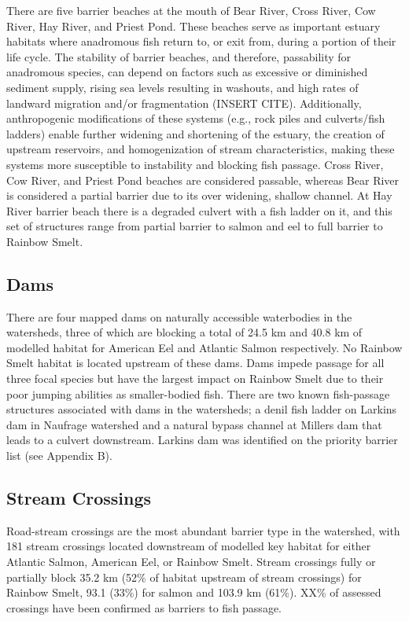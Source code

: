 \documentclass[
  letterpaper,
  DIV=11,
  numbers=noendperiod]{scrreprt}
\begin{document}
There are five barrier beaches at the mouth of Bear River, Cross River,
Cow River, Hay River, and Priest Pond. These beaches serve as important
estuary habitats where anadromous fish return to, or exit from, during a
portion of their life cycle. The stability of barrier beaches, and
therefore, passability for anadromous species, can depend on factors
such as excessive or diminished sediment supply, rising sea levels
resulting in washouts, and high rates of landward migration and/or
fragmentation (INSERT CITE). Additionally, anthropogenic modifications
of these systems (e.g., rock piles and culverts/fish ladders) enable
further widening and shortening of the estuary, the creation of upstream
reservoirs, and homogenization of stream characteristics, making these
systems more susceptible to instability and blocking fish passage. Cross
River, Cow River, and Priest Pond beaches are considered passable,
whereas Bear River is considered a partial barrier due to its over
widening, shallow channel. At Hay River barrier beach there is a
degraded culvert with a fish ladder on it, and this set of structures
range from partial barrier to salmon and eel to full barrier to Rainbow
Smelt.

\subsection*{Dams}\label{dams}

There are four mapped dams on naturally accessible waterbodies in the
watersheds, three of which are blocking a total of 24.5 km and 40.8 km
of modelled habitat for American Eel and Atlantic Salmon respectively.
No Rainbow Smelt habitat is located upstream of these dams. Dams impede
passage for all three focal species but have the largest impact on
Rainbow Smelt due to their poor jumping abilities as smaller-bodied
fish. There are two known fish-passage structures associated with dams
in the watersheds; a denil fish ladder on Larkins dam in Naufrage
watershed and a natural bypass channel at Millers dam that leads to a
culvert downstream. Larkins dam was identified on the priority barrier
list (see Appendix B).

\subsection*{Stream Crossings}\label{stream-crossings}

Road-stream crossings are the most abundant barrier type in the
watershed, with 181 stream crossings located downstream of modelled key
habitat for either Atlantic Salmon, American Eel, or Rainbow Smelt.
Stream crossings fully or partially block 35.2 km (52\% of habitat
upstream of stream crossings) for Rainbow Smelt, 93.1 (33\%) for salmon
and 103.9 km (61\%). XX\% of assessed crossings have been confirmed as
barriers to fish passage.
\end{document}
